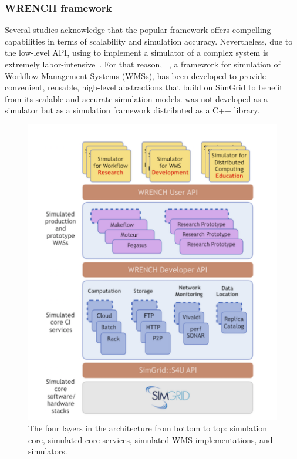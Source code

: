\subsubsection{WRENCH framework}

Several studies acknowledge that the popular \simgrid framework
offers compelling capabilities in terms of scalability and simulation accuracy.
Nevertheless, due to the low-level API, using \simgrid to implement 
a simulator of a complex system is extremely labor-intensive~\cite{kecskemeti_2014}. 
For that reason, \wrench ~\cite{casanova2020fgcs}, a framework for 
simulation of Workflow Management Systems (WMSs), has been developed 
to provide convenient, reusable, high-level abstractions that build on 
SimGrid to benefit from its scalable and accurate simulation models.
\wrench was not developed as a simulator but as a simulation framework 
distributed as a C++ library. 

\begin{figure}[!h]
     \centering
     \includegraphics[width=0.75\linewidth]{figures/wrench.png}
     \caption{The four layers in the \wrench architecture from bottom 
     to top: simulation core, simulated core services, 
     simulated WMS implementations, and simulators.}
     \label{fig:wrench}
\end{figure}

